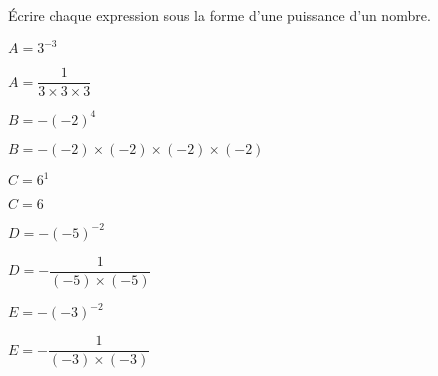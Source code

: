     Écrire chaque expression sous la forme d'une puissance d'un nombre.
    \begin{list}{}{}
        \item[] $A=3^{-3}$

        {\red $A=\dfrac{1}{3\times3\times3}$}
        \item[] $B=-(-2)^{4}$

        {\red $B=-(-2)\times(-2)\times(-2)\times(-2)$}
        \item[] $C=6^{1}$

        {\red $C=6$}
        \item[] $D=-(-5)^{-2}$

        {\red $D=-\dfrac{1}{(-5)\times(-5)}$}
        \item[] $E=-(-3)^{-2}$

        {\red $E= -\dfrac{1}{(-3)\times(-3)}$}
    \end{list}
